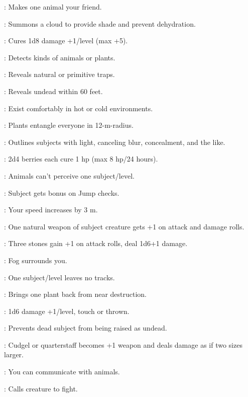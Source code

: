 : Makes one animal your friend.

: Summons a cloud to provide shade and prevent dehydration.

: Cures 1d8 damage +1/level (max +5).

: Detects kinds of animals or plants.

: Reveals natural or primitive traps.

: Reveals undead within 60 feet.

: Exist comfortably in hot or cold environments.

: Plants entangle everyone in 12-m-radius.

: Outlines subjects with light, canceling blur, concealment, and the like.

: 2d4 berries each cure 1 hp (max 8 hp/24 hours).

: Animals can't perceive one subject/level.

: Subject gets bonus on Jump checks.

: Your speed increases by 3 m.

: One natural weapon of subject creature gets +1 on attack and damage rolls.

: Three stones gain +1 on attack rolls, deal 1d6+1 damage.

: Fog surrounds you.

: One subject/level leaves no tracks.

: Brings one plant back from near destruction.

: 1d6 damage +1/level, touch or thrown.

: Prevents dead subject from being raised as undead.

: Cudgel or quarterstaff becomes +1 weapon and deals damage as if two sizes larger.

: You can communicate with animals.

: Calls creature to fight.



